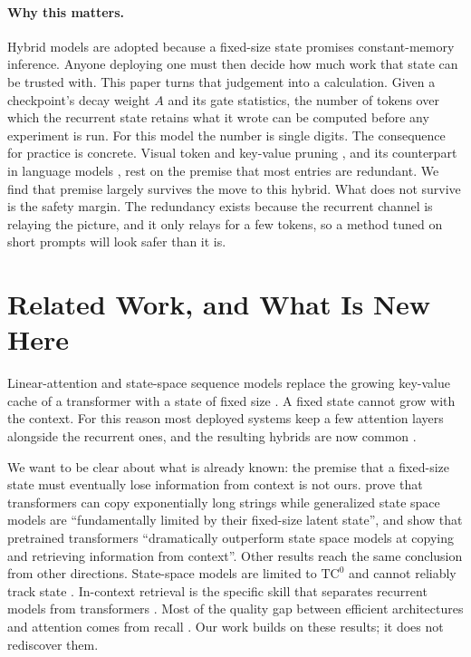 \documentclass{article}
\begin{document}
\paragraph{Why this matters.} Hybrid models are adopted because a fixed-size
state promises constant-memory inference. Anyone deploying one must then
decide how much work that state can be trusted with. This paper turns that
judgement into a calculation. Given a checkpoint's decay weight $A$ and its
gate statistics, the number of tokens over which the recurrent state retains
what it wrote can be computed before any experiment is run. For this model the
number is single digits. The consequence for practice is concrete. Visual
token and key-value pruning
\citep{chen2024fastv,yang2024visionzip,shang2025prumerge}, and its counterpart
in language models \citep{zhang2023h2o,li2024snapkv,xiao2024streaming}, rest
on the premise that most entries are redundant. We find that premise largely
survives the move to this hybrid. What does not survive is the safety margin.
The redundancy exists because the recurrent channel is relaying the picture,
and it only relays for a few tokens, so a method tuned on short prompts will
look safer than it is.

\section{Related Work, and What Is New Here}

Linear-attention and state-space sequence models replace the growing key-value
cache of a transformer with a state of fixed size
\citep{katharopoulos2020linear,gu2022s4,peng2023rwkv,gu2023mamba,dao2024mamba2,beck2024xlstm}.
A fixed state cannot grow with the context. For this reason most deployed
systems keep a few attention layers alongside the recurrent ones, and the
resulting hybrids are now common
\citep{lieber2024jamba,glorioso2024zamba,de2024griffin,ren2025samba,waleffe2024empirical}.

We want to be clear about what is already known: the premise that a fixed-size
state must eventually lose information from context is not ours.
\citet{jelassi2024copying} prove that transformers can copy exponentially long
strings while generalized state space models are ``fundamentally limited by
their fixed-size latent state'', and show that pretrained transformers
``dramatically outperform state space models at copying and retrieving
information from context''. Other results reach the same conclusion from other
directions. State-space models are limited to $\mathrm{TC}^0$ and cannot
reliably track state \citep{merrill2024illusion}. In-context retrieval is the
specific skill that separates recurrent models from transformers
\citep{wen2024rnns}. Most of the quality gap between efficient architectures
and attention comes from recall \citep{arora2023zoology,arora2024based}. Our
work builds on these results; it does not rediscover them.
\end{document}
